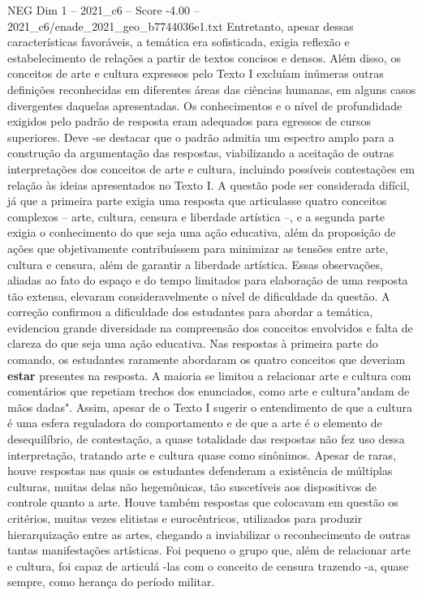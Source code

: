 \begin{textsample}{NEG Dim 1 – 2021\_c6 – Score -4.00 – 2021\_c6/enade\_2021\_geo\_b7744036e1.txt}
Entretanto, apesar dessas características favoráveis, a temática era sofisticada, exigia reflexão e estabelecimento de relações a partir de textos concisos e densos.
Além disso, os conceitos de arte e cultura expressos pelo Texto I excluíam inúmeras outras definições reconhecidas em diferentes áreas das ciências humanas, em alguns casos divergentes daquelas apresentadas.
Os conhecimentos e o nível de profundidade exigidos pelo padrão de resposta eram adequados para egressos de cursos superiores.
Deve -se destacar que o padrão admitia um espectro amplo para a construção da argumentação das respostas, viabilizando a aceitação de outras interpretações dos conceitos de arte e cultura, incluindo possíveis contestações em relação às ideias apresentados no Texto I.
A questão pode ser considerada difícil, já que a primeira parte exigia uma resposta que articulasse quatro conceitos complexos – arte, cultura, censura e liberdade artística –, e a segunda parte exigia o conhecimento do que seja uma ação educativa, além da proposição de ações que objetivamente contribuíssem para minimizar as tensões entre arte, cultura e censura, além de garantir a liberdade artística.
Essas observações, aliadas ao fato do espaço e do tempo limitados para elaboração de uma resposta tão extensa, elevaram consideravelmente o nível de dificuldade da questão.
A correção confirmou a dificuldade dos estudantes para abordar a temática, evidenciou grande diversidade na compreensão dos conceitos envolvidos e falta de clareza do que seja uma ação educativa.
Nas respostas à primeira parte do comando, os estudantes raramente abordaram os quatro conceitos que deveriam \textbf{estar} presentes na resposta.
A maioria se limitou a relacionar arte e cultura com comentários que repetiam trechos dos enunciados, como arte e cultura"andam de mãos dadas".
Assim, apesar de o Texto I sugerir o entendimento de que a cultura é uma esfera reguladora do comportamento e de que a arte é o elemento de desequilíbrio, de contestação, a quase totalidade das respostas não fez uso dessa interpretação, tratando arte e cultura quase como sinônimos.
Apesar de raras, houve respostas nas quais os estudantes defenderam a existência de múltiplas culturas, muitas delas não hegemônicas, tão suscetíveis aos dispositivos de controle quanto a arte.
Houve também respostas que colocavam em questão os critérios, muitas vezes elitistas e eurocêntricos, utilizados para produzir hierarquização entre as artes, chegando a inviabilizar o reconhecimento de outras tantas manifestações artísticas.
Foi pequeno o grupo que, além de relacionar arte e cultura, foi capaz de articulá -las com o conceito de censura trazendo -a, quase sempre, como herança do período militar.

\end{textsample}
